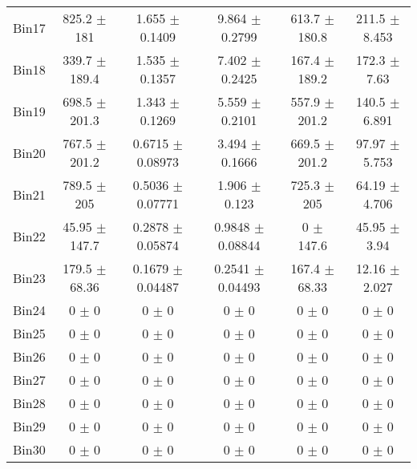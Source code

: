 \begin{tabular}{@{\extracolsep{4pt}}lccccc@{}}
     Bin17 & 825.2 $\pm$ 181 & 1.655 $\pm$ 0.1409 & 9.864 $\pm$ 0.2799 & 613.7 $\pm$ 180.8 & 211.5 $\pm$ 8.453 \\ 
     Bin18 & 339.7 $\pm$ 189.4 & 1.535 $\pm$ 0.1357 & 7.402 $\pm$ 0.2425 & 167.4 $\pm$ 189.2 & 172.3 $\pm$ 7.63 \\ 
     Bin19 & 698.5 $\pm$ 201.3 & 1.343 $\pm$ 0.1269 & 5.559 $\pm$ 0.2101 & 557.9 $\pm$ 201.2 & 140.5 $\pm$ 6.891 \\ 
     Bin20 & 767.5 $\pm$ 201.2 & 0.6715 $\pm$ 0.08973 & 3.494 $\pm$ 0.1666 & 669.5 $\pm$ 201.2 & 97.97 $\pm$ 5.753 \\ 
     Bin21 & 789.5 $\pm$ 205 & 0.5036 $\pm$ 0.07771 & 1.906 $\pm$ 0.123 & 725.3 $\pm$ 205 & 64.19 $\pm$ 4.706 \\ 
     Bin22 & 45.95 $\pm$ 147.7 & 0.2878 $\pm$ 0.05874 & 0.9848 $\pm$ 0.08844 & 0 $\pm$ 147.6 & 45.95 $\pm$ 3.94 \\ 
     Bin23 & 179.5 $\pm$ 68.36 & 0.1679 $\pm$ 0.04487 & 0.2541 $\pm$ 0.04493 & 167.4 $\pm$ 68.33 & 12.16 $\pm$ 2.027 \\ 
     Bin24 & 0 $\pm$ 0 & 0 $\pm$ 0 & 0 $\pm$ 0 & 0 $\pm$ 0 & 0 $\pm$ 0 \\ 
     Bin25 & 0 $\pm$ 0 & 0 $\pm$ 0 & 0 $\pm$ 0 & 0 $\pm$ 0 & 0 $\pm$ 0 \\ 
     Bin26 & 0 $\pm$ 0 & 0 $\pm$ 0 & 0 $\pm$ 0 & 0 $\pm$ 0 & 0 $\pm$ 0 \\ 
     Bin27 & 0 $\pm$ 0 & 0 $\pm$ 0 & 0 $\pm$ 0 & 0 $\pm$ 0 & 0 $\pm$ 0 \\ 
     Bin28 & 0 $\pm$ 0 & 0 $\pm$ 0 & 0 $\pm$ 0 & 0 $\pm$ 0 & 0 $\pm$ 0 \\ 
     Bin29 & 0 $\pm$ 0 & 0 $\pm$ 0 & 0 $\pm$ 0 & 0 $\pm$ 0 & 0 $\pm$ 0 \\ 
     Bin30 & 0 $\pm$ 0 & 0 $\pm$ 0 & 0 $\pm$ 0 & 0 $\pm$ 0 & 0 $\pm$ 0 \\ 
\hline\hline
  \end{tabular}
